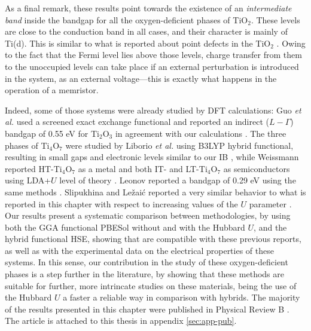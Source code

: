 As a final remark, these results point towards the existence of an \textit{intermediate band} inside the bandgap for all the oxygen-deficient phases of TiO$_2$. These levels are close to the conduction band in all cases, and their character is mainly of Ti(d). This is similar to what is reported about point defects in the TiO$_2$ \cite{Janotti2010,Lee2012}. Owing to the fact that the Fermi level lies above those levels, charge transfer from them to the unoccupied levels can take place if an external perturbation is introduced in the system, as an external voltage---this is exactly what happens in the operation of a memristor. 

Indeed, some of those systems were already studied by DFT calculations: Guo \textit{et al.} used a screened exact exchange functional and reported an indirect ($L-\Gamma$) bandgap of 0.55 eV for Ti$_2$O$_3$ in agreement with our calculations \cite{Guo2012}. The three phases of Ti$_4$O$_7$ were studied by Liborio \textit{et al.} using B3LYP hybrid functional, resulting in small gaps and electronic levels similar to our IB \cite{Liborio2009}, while Weissmann reported HT-Ti$_4$O$_7$ as a metal and both IT- and LT-Ti$_4$O$_7$ as semiconductors using LDA+$U$ level of theory \cite{Weissmann2011}. Leonov reported a bandgap of 0.29 eV using the same methods \cite{Leonov2006}. Slipukhina and Le\v{z}ai\'{c} reported a very similar behavior to what is reported in this chapter with respect to increasing values of the $U$ parameter \cite{Slipukhina2014}. Our results present a systematic comparison between methodologies, by using both the GGA functional PBESol without and with the Hubbard $U$, and the hybrid functional HSE, showing that are compatible with these previous reports, as well as with the experimental data on the electrical properties of these systems. In this sense, our contribution in the study of these oxygen-deficient phases is a step further in the literature, by showing that these methods are suitable for further, more intrincate studies on these materials, being the use of the Hubbard $U$ a faster a reliable way in comparison with hybrids. The majority of the results presented in this chapter were published in Physical Review B \cite{Padilha2014}. The article is attached to this thesis in appendix \ref{sec:app-pub}.